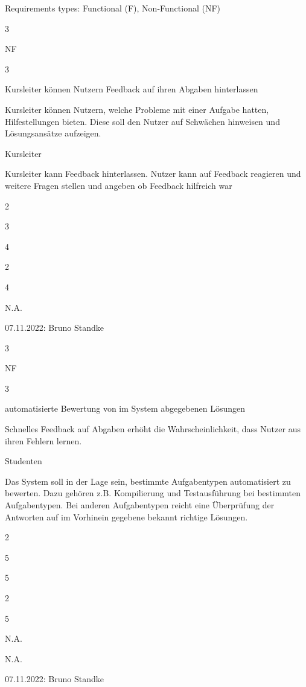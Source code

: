 \documentclass{article}
\newenvironment{myreq}[1]{%
\setlist[description]{font=\normalfont\color{darkgray}}%
\begin{tcolorbox}[colframe=black,colback=white, sharp corners, boxrule=1pt]%
\bfseries\color{blue}%
\begin{description}#1}%
{\end{description}\end{tcolorbox}}
\newcommand{\threeinline}[3]{\begin{multicols}{3}#1 #2 #3\end{multicols}}
\newcommand{\twoinline}[2]{\begin{multicols}{2}#1 #2\end{multicols}}
\newcommand{\reqno}{\item[Requirement \#: ]}
\newcommand{\reqtype}{\item[Req. Type:]}
\newcommand{\reqevent}{\item[Meilenstein \#:]}
\newcommand{\reqdesc}{\item[Description:]}
\newcommand{\reqrat}{\item[Rationale:]}
\newcommand{\reqorig}{\item[Originator:]}
\newcommand{\reqfit}{\item[Fit Criterion:]}
\newcommand{\reqsatis}{\item[Customer Satisfaction:]}
\newcommand{\reqdissat}{\item[Customer Dissatisfaction:]}
\newcommand{\reqprio}{\item[Priority:]}
\newcommand{\reqconf}{\item[Conflicts:]}
\newcommand{\reqmater}{\item[Materials:]}
\newcommand{\reqhist}{\item[History:]}
\begin{document}
Requirements types: Functional (F), Non-Functional (NF)



\begin{myreq}
  \threeinline
  {\reqno}
  {\reqtype NF}
  {\reqevent 3}
  \reqdesc Kursleiter können Nutzern Feedback auf ihren Abgaben hinterlassen
  \reqrat Kursleiter können Nutzern, welche Probleme mit einer Aufgabe hatten, Hilfestellungen bieten. Diese soll den Nutzer auf Schwächen hinweisen und Lösungsansätze aufzeigen.
  \reqorig Kursleiter
  \reqfit Kursleiter kann Feedback hinterlassen. Nutzer kann auf Feedback reagieren und weitere Fragen stellen und angeben ob Feedback hilfreich war
  \twoinline
  {\reqsatis 3}
  {\reqdissat 4}
  \twoinline
  {\reqprio 4}
  {\reqconf N.A.}
  \reqmater {}
  \reqhist 07.11.2022: Bruno Standke
\end{myreq}
\begin{myreq}
  \threeinline
  {\reqno}
  {\reqtype NF}
  {\reqevent 3}
  \reqdesc automatisierte Bewertung von im System abgegebenen Lösungen
  \reqrat Schnelles Feedback auf Abgaben erhöht die Wahrscheinlichkeit, dass Nutzer aus ihren Fehlern lernen.
  \reqorig Studenten
  \reqfit Das System soll in der Lage sein, bestimmte Aufgabentypen automatisiert zu bewerten. Dazu gehören z.B. Kompilierung und Testausführung bei bestimmten Aufgabentypen. Bei anderen Aufgabentypen reicht eine Überprüfung der Antworten auf im Vorhinein gegebene bekannt richtige Lösungen.
  \twoinline
  {\reqsatis 5}
  {\reqdissat 5}
  \twoinline
  {\reqprio 5}
  {\reqconf N.A.}
  \reqmater N.A.
  \reqhist 07.11.2022: Bruno Standke
\end{myreq}
\end{document}
